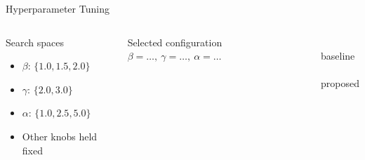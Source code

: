 \documentclass[9pt,aspectratio=169]{beamer}
\begin{document}
\begin{frame}{Hyperparameter Tuning}
  \begin{columns}[T,onlytextwidth]
      \begin{block}{Search spaces}
        \begin{itemize}
          \item $\beta$: $\{1.0,1.5,2.0\}$
          \item $\gamma$: $\{2.0,3.0\}$
          \item $\alpha$: $\{1.0,2.5,5.0\}$
          \item Other knobs held fixed
        \end{itemize}
      \end{block}
      \begin{block}{Selected configuration}
        $\beta=\ldots,\ \gamma=\ldots,\ \alpha=\ldots$
      \end{block}
      \begin{block}{}
        \vspace{-0.6em}
        \centering
        \\[-0.2em]
        {\scriptsize baseline}\\[0.4em]
        \\[-0.2em]
        {\scriptsize proposed}
        \vspace{-0.6em}
      \end{block}
  \end{columns}
\end{frame}
\end{document}
